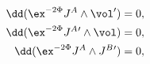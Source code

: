 \begin{equation}
\label{susucond}
\begin{aligned}
   \dd(\ex^{-2\Phi}J^A\wedge \vol') &=0 , \\
   \dd(\ex^{-2\Phi}J^A{}'\wedge \vol)&=0 , \\
   \dd(\ex^{-2\Phi}J^A\wedge J^B{}')&=0 ,
\end{aligned}
\end{equation}

